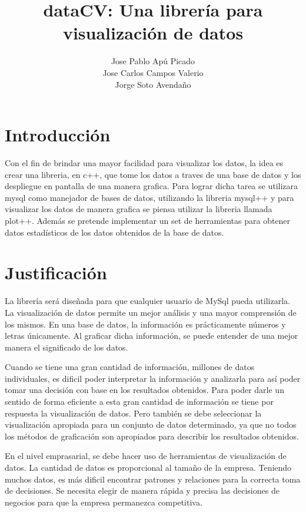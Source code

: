 \documentclass[a4paper]{article}
\title{dataCV: Una librería para visualización de datos}
\author{Jose Pablo Apú Picado \\
		Jose Carlos Campos Valerio \\
        Jorge Soto Avendaño}
\begin{document}
\maketitle

\section{Introducción}

Con el fin de brindar una mayor facilidad para visualizar los datos, 
la idea es crear una libreria, en c++, que tome los datos a traves de una 
base de datos y los despliegue en pantalla de una manera grafica. Para lograr 
dicha tarea se utilizara mysql como manejador de bases de datos, utilizando 
la libreria mysql++ y para visualizar los datos de manera grafica se piensa 
utilizar la libreria llamada plot++. Además se pretende implementar un set 
de herramientas para obtener datos estadísticos de los datos obtenidos de la base de datos. 

\section{Justificación}

La librería será diseñada para que cualquier usuario de MySql pueda utilizarla.
La visualización de datos permite un mejor análisis y una mayor comprensión 
de los mismos. En una base de datos, la información es prácticamente números 
y letras únicamente. Al graficar dicha información, se puede entender de una mejor
manera el significado de los datos.

Cuando se tiene una gran cantidad de información, millones de datos individuales, 
es dificil poder interpretar la información y analizarla para así poder tomar
una decisión con base en los resultados obtenidos. Para poder darle un sentido
de forma eficiente a esta gran cantidad de información se tiene por respuesta 
la visualización de datos. Pero también se debe seleccionar la visualización
apropiada para un conjunto de datos determinado, ya que no todos los métodos 
de graficación son apropiados para describir los resultados obtenidos.\cite{oreilly} 

En el nivel emprasarial, se debe hacer uso de herramientas de visualización de datos.
La cantidad de datos es proporcional al tamaño de la empresa. Teniendo muchos datos, 
es más dificil encontrar patrones y relaciones para la correcta toma de decisiones. 
Se necesita elegir de manera rápida y precisa las decisiones de negocios para que 
la empresa permanezca competitiva.\cite{dundas}
\end{document}
